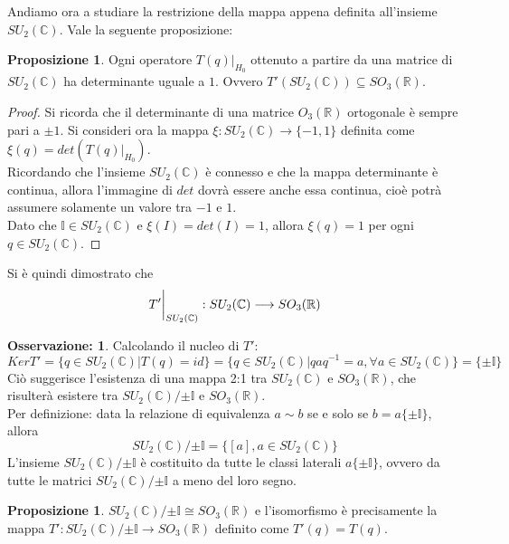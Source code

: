 \documentclass[12pt,a4paper]{report}
\theoremstyle{definition}
\newtheorem{Prop}[Def]{Proposizione}
\theoremstyle{definition}
\theoremstyle{definition}
\theoremstyle{definition}
\newtheorem{Obs}[Def]{Osservazione:}
\begin{document}
Andiamo ora a studiare la restrizione della mappa appena definita all'insieme $SU_2(\mathbb{C})$. Vale la seguente proposizione:
\begin{Prop}
	Ogni operatore $T(q)|_{H_0}$ ottenuto a partire da una matrice di $SU_2(\mathbb{C})$ ha determinante uguale a $1$. Ovvero $T'(SU_2(\mathbb{C}))\subseteq SO_3(\mathbb{R})$. 
\end{Prop}
\begin{proof}
	Si ricorda che il determinante di una matrice $O_3(\mathbb{R})$ ortogonale è sempre pari a $\pm 1$.
	Si consideri ora la mappa $\xi:SU_2(\mathbb{C})\longrightarrow \{-1,1\}$ definita come $\xi(q)=det(T(q)|_{H_0})$.\\
	Ricordando che l'insieme $SU_2(\mathbb{C})$ è connesso e che la mappa determinante è continua, allora l'immagine di $det$ dovrà essere anche essa continua, cioè potrà assumere solamente un valore tra $-1$ e $1$.\\
	Dato che $\mathbb{I}\in SU_2(\mathbb{C})$ e $\xi(I)=det(I)=1$, allora $\xi(q)=1$ per ogni $q\in SU_2(\mathbb{C})$.
\end{proof}
Si è quindi dimostrato che 
$$T'\bigg{\rvert}_{SU_2(\mathbb{C})}:SU_2(\mathbb{C})\longrightarrow SO_3(\mathbb{R})$$
\begin{Obs} \label{Obs:3.2.3.1}
	Calcolando il nucleo di $T'$:$$KerT'=\{q\in SU_2(\mathbb{C})| T(q)=id\}=\{q\in SU_2(\mathbb{C})|qaq^{-1}=a, \forall a\in SU_2(\mathbb{C})\}=\{\pm\mathbb{I}\}$$
	Ciò suggerisce l'esistenza di una mappa 2:1 tra $SU_2(\mathbb{C})$ e $SO_3(\mathbb{R})$, che risulterà esistere tra $SU_2(\mathbb{C})/{\pm \mathbb{I}}$ e $SO_3(\mathbb{R})$.\\
	Per definizione: data la relazione di equivalenza $a\sim b$ se e solo se $b=a\{\pm \mathbb{I}\}$, allora
	$$SU_2(\mathbb{C})/{\pm \mathbb{I}}=\{[a], a\in SU_2(\mathbb{C})\}$$
	L'insieme $SU_2(\mathbb{C})/{\pm \mathbb{I}}$ è costituito da tutte le classi laterali $a\{\pm\mathbb{I}\}$, ovvero da tutte le matrici $SU_2(\mathbb{C})/{\pm \mathbb{I}}$ a meno del loro segno.
\end{Obs}
\begin{Prop}
	$SU_2(\mathbb{C})/{\pm \mathbb{I}}\cong SO_3(\mathbb{R})$ e l'isomorfismo è precisamente la mappa $T':SU_2(\mathbb{C})/{\pm \mathbb{I}}\longrightarrow SO_3(\mathbb{R})$ definito come $T'(q)=T(q)$.
\end{Prop}
\end{document}

